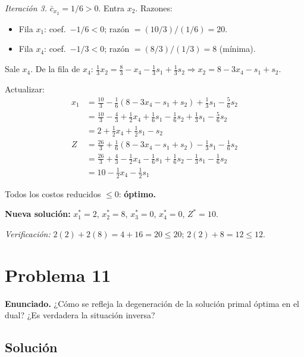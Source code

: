 \documentclass{article}
\begin{document}
\begin{enumerate}[a)]
\textit{Iteración 3.} $\bar{c}_{x_2}=1/6>0$. Entra $x_2$. Razones:
\begin{itemize}
  \item Fila $x_1$: coef.\ $-1/6<0$; razón $=(10/3)/(1/6)=20$.
  \item Fila $x_4$: coef.\ $-1/3<0$; razón $=(8/3)/(1/3)=8$ (mínima).
\end{itemize}
Sale $x_4$. De la fila de $x_4$: $\tfrac{1}{3}x_2=\tfrac{8}{3}-x_4-\tfrac{1}{3}s_1+\tfrac{1}{3}s_2 \Rightarrow x_2=8-3x_4-s_1+s_2$.

Actualizar:
\begin{align*}
x_1&=\tfrac{10}{3}-\tfrac{1}{6}(8-3x_4-s_1+s_2)+\tfrac{1}{3}s_1-\tfrac{5}{6}s_2\\
&=\tfrac{10}{3}-\tfrac{4}{3}+\tfrac{1}{2}x_4+\tfrac{1}{6}s_1-\tfrac{1}{6}s_2+\tfrac{1}{3}s_1-\tfrac{5}{6}s_2\\
&=2+\tfrac{1}{2}x_4+\tfrac{1}{2}s_1-s_2\\
Z&=\tfrac{26}{3}+\tfrac{1}{6}(8-3x_4-s_1+s_2)-\tfrac{1}{3}s_1-\tfrac{1}{6}s_2\\
&=\tfrac{26}{3}+\tfrac{4}{3}-\tfrac{1}{2}x_4-\tfrac{1}{6}s_1+\tfrac{1}{6}s_2-\tfrac{1}{3}s_1-\tfrac{1}{6}s_2\\
&=10-\tfrac{1}{2}x_4-\tfrac{1}{2}s_1
\end{align*}

Todos los costos reducidos $\leq0$: \textbf{óptimo.}

\textbf{Nueva solución:} $x_1^*=2$, $x_2^*=8$, $x_3^*=0$, $x_4^*=0$, $Z^*=10$.

\textit{Verificación:} $2(2)+2(8)=4+16=20\leq20$\;\checkmark; $2(2)+8=12\leq12$\;\checkmark.

\end{enumerate}

\newpage
\section*{Problema 11}

\textbf{Enunciado.} ¿Cómo se refleja la degeneración de la solución primal óptima en el dual? ¿Es verdadera la situación inversa?

\subsection*{Solución}
\end{document}

